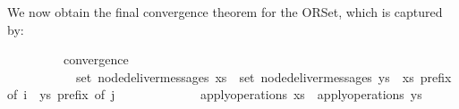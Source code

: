 We now obtain the final convergence theorem for the ORSet, which is captured by:
\vspace{0.35em}
\begin{isabellebody}
\ \ \ \ \ \ \ \ \ convergence{\isacharcolon}\isanewline
\ \ \ \ \ \ \ \ \ \ \ {\isachardoublequoteopen}set\ {\isacharparenleft}node{\isacharunderscore}deliver{\isacharunderscore}messages\ xs{\isacharparenright}\ {\isacharequal}\ set\ {\isacharparenleft}node{\isacharunderscore}deliver{\isacharunderscore}messages\ ys{\isacharparenright}{\isachardoublequoteclose}\ \ {\isachardoublequoteopen}xs\ prefix\ of\ i{\isachardoublequoteclose}\ \ {\isachardoublequoteopen}ys\ prefix\ of\ j{\isachardoublequoteclose}\isanewline
\ \ \ \ \ \ \ \ \ \ \ \ \ {\isachardoublequoteopen}apply{\isacharunderscore}operations\ xs\ {\isacharequal}\ apply{\isacharunderscore}operations\ ys{\isachardoublequoteclose}
\end{isabellebody}
